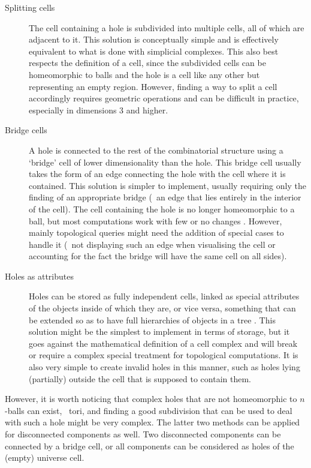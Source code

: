 \begin{description}
\item[Splitting cells]
The cell containing a hole is subdivided into multiple cells, all of which are adjacent to it.
This solution is conceptually simple and is effectively equivalent to what is done with simplicial complexes.
This also best respects the definition of a cell, since the subdivided cells can be homeomorphic to balls and the hole is a cell like any other but representing an empty region.
However, finding a way to split a cell accordingly requires geometric operations and can be difficult in practice, especially in dimensions 3 and higher.
\item[Bridge cells]
A hole is connected to the rest of the combinatorial structure using a `bridge' cell of lower dimensionality than the hole.
This bridge cell usually takes the form of an edge connecting the hole with the cell where it is contained.
This solution is simpler to implement, usually requiring only the finding of an appropriate bridge (\eg\ an edge that lies entirely in the interior of the cell).
The cell containing the hole is no longer homeomorphic to a ball, but most computations work with few or no changes \citep{Bryant85}.
However, mainly topological queries might need the addition of special cases to handle it (\eg\ not displaying such an edge when visualising the cell or accounting for the fact the bridge will have the same cell on all sides).
\item[Holes as attributes]
Holes can be stored as fully independent cells, linked as special attributes of the objects inside of which they are, or vice versa, something that can be extended so as to have full hierarchies of objects in a tree \citep{Worboys12}.
This solution might be the simplest to implement in terms of storage, but it goes against the mathematical definition of a cell complex and will break or require a complex special treatment for topological computations.
It is also very simple to create invalid holes in this manner, such as holes lying (partially) outside the cell that is supposed to contain them.
\end{description}

However, it is worth noticing that complex holes that are not homeomorphic to $n$-balls can exist, \eg\ tori, and finding a good subdivision that can be used to deal with such a hole might be very complex.
The latter two methods can be applied for disconnected components as well.
Two disconnected components can be connected by a bridge cell, or all components can be considered as holes of the (empty) universe cell.

